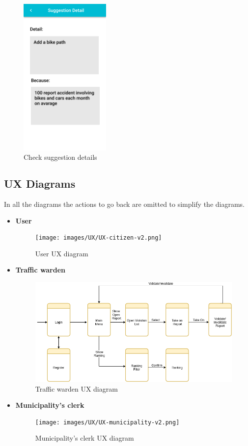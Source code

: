 \documentclass{article}
\begin{document}
\clearpage
\begin{figure}[!htb]
		\centering
		\includegraphics[height=7.9cm,keepaspectratio]{images/mockups/Suggestions_Detail.png}
		\caption{Check suggestion details}
\end{figure}


\clearpage
\subsection{UX Diagrams}
In all the diagrams the actions to go back are omitted to simplify the diagrams.
\begin{itemize} 
	\item \bf User
		\begin{figure}[!htb]
			\centering
			\texttt{[image: images/UX/UX-citizen-v2.png]}
			\caption{User UX diagram}
		\end{figure}

	\item \bf Traffic warden
		\begin{figure}[!htb]
			\centering
			\includegraphics[width=1.0\textwidth]{images/UX/UX-traffic-warden-v2.png}
			\caption{Traffic warden UX diagram}
		\end{figure}
\newpage
	\item \bf Municipality's clerk
		\begin{figure}[!htb]
			\centering
			\texttt{[image: images/UX/UX-municipality-v2.png]}
			\caption{Municipality's clerk UX diagram}
		\end{figure}
\end{itemize} 
\end{document}
